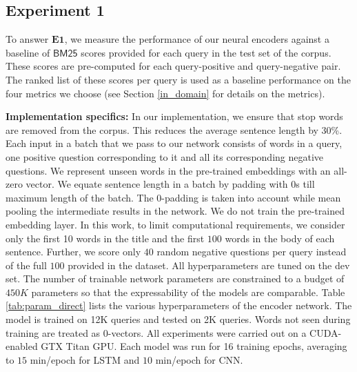 \documentclass{sigkddExp}
\begin{document}
\subsection{Experiment 1}
To answer $\mathbf{E1}$, we measure the performance of our neural encoders against a baseline of $\mathsf{BM25}$ scores provided for each query in the test set of the corpus. These scores are pre-computed for each query-positive and query-negative pair. The ranked list of these scores per query is used as a baseline performance on the four metrics we choose (see Section \ref{in_domain} for details on the metrics).

\textbf{Implementation specifics:}
In our implementation, we ensure that stop words are removed from the corpus. This reduces the average sentence length by 30\%. Each input in a batch that we pass to our network consists of words in a query, one positive question corresponding to it and all its corresponding negative questions.  We represent unseen words in the pre-trained embeddings with an all-zero vector. We equate sentence length in a batch by padding with $0$s till maximum length of the batch. The 0-padding is taken into account while mean pooling the intermediate results in the network. We do not train the pre-trained embedding layer. In this work, to limit computational requirements, we consider only the first 10 words in the title and the first $100$ words in the body of each sentence. Further, we score only $40$ random negative questions per query instead of the full $100$ provided in the dataset. All hyperparameters are tuned on the dev set. The number of trainable network parameters are constrained to a budget of $450K$ parameters so that the expressability of the models are comparable. Table \ref{tab:param_direct} lists the various hyperparameters of the encoder network. The model is trained on 12K queries and tested on 2K queries. Words not seen during training are treated as 0-vectors. All experiments were carried out on a CUDA-enabled GTX Titan GPU. Each model was run for 16 training epochs, averaging to $15$ min/epoch for LSTM and $10$ min/epoch for CNN.
\end{document}
